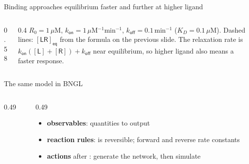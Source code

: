 \documentclass[aspectratio=169,10pt,t]{beamer}
\newcommand{\modeldir}{../../models}
\newcommand{\conc}[1]{[\mathsf{#1}]}
\begin{document}
\begin{frame}{Binding approaches equilibrium faster and further at higher ligand}
  \begin{columns}[c]
    \begin{column}{0.58\textwidth}
    \end{column}
    \begin{column}{0.4\textwidth}
      \small
      $R_0 = 1\,\mu$M, $k_\mathsf{on} = 1\,\mu$M$^{-1}$min$^{-1}$,
      $k_\mathsf{off} = 0.1\,$min$^{-1}$ ($K_D = 0.1\,\mu$M).
      \vskip2mm
      Dashed lines: $\conc{LR}_\mathsf{eq}$ from the formula on the previous slide.
      \vskip2mm
      The relaxation rate is $k_\mathsf{on}(\conc{L}+\conc{R}) + k_\mathsf{off}$
      near equilibrium, so higher ligand also means a faster response.
    \end{column}
  \end{columns}
\end{frame}

\begin{frame}[fragile]{The same model in BNGL}
  \begin{columns}[T]
    \begin{column}{0.49\textwidth}
      
    \end{column}
    \begin{column}{0.49\textwidth}
      
      \vskip1mm
      {\scriptsize
      \begin{itemize}
        \item<3-> \textbf{observables}: quantities to output
        \item<4-> \textbf{reaction rules}: \code{<->} is reversible; forward and reverse rate constants
        \item<5-> \textbf{actions} after : generate the network, then simulate
      \end{itemize}}
    \end{column}
  \end{columns}
\end{frame}
\end{document}
